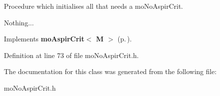 Procedure which initialises all that needs a mo\-No\-Aspir\-Crit. 

Nothing... 

Implements {\bf mo\-Aspir\-Crit$<$ M $>$} {\rm (p.\,\pageref{classmo_aspir_crit_a0})}.

Definition at line 73 of file mo\-No\-Aspir\-Crit.h.

The documentation for this class was generated from the following file:\begin{CompactItemize}
\item 
mo\-No\-Aspir\-Crit.h\end{CompactItemize}
